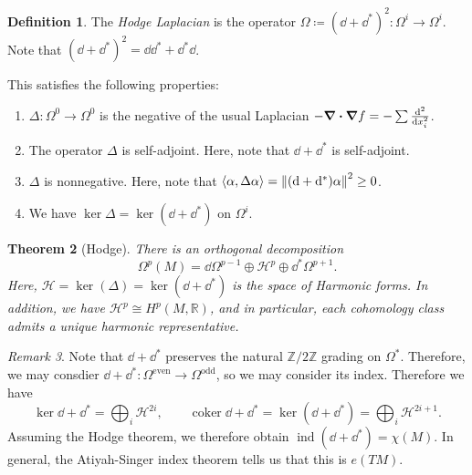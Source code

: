 \documentclass[leqno, openany]{memoir}
\newtheorem{thm}{Theorem}[section]
\theoremstyle{definition}
\newtheorem{defn}[thm]{Definition}
\theoremstyle{remark}
\newtheorem{rmk}[thm]{Remark}
\theoremstyle{plain}
\theoremstyle{definition}
\theoremstyle{remark}
\newcommand{\R}{\mathbb{R}}
\newcommand{\Z}{\mathbb{Z}}
\newcommand{\mc}[1]{\mathcal{#1}}
\newcommand{\mr}[1]{\mathrm{#1}}
\DeclareMathOperator{\coker}{coker}
\DeclareMathOperator{\ind}{ind}
\begin{document}
\begin{defn}
    The \textit{Hodge Laplacian} is the operator $\Omega \coloneqq {(\dd + \dd^*)}^2 \colon \Omega^i \to \Omega^i$. Note that ${(\dd + \dd^*)}^2 = \dd \dd^* + \dd^* \dd$.
\end{defn}

This satisfies the following properties: 
\begin{enumerate}
    \item $\Delta \colon \Omega^0 \to \Omega^0$ is the negative of the usual Laplacian $- \div \grad f = - \sum \dv[2]{x_i}$.
    \item The operator $\Delta$ is self-adjoint. Here, note that $\dd + \dd^*$ is self-adjoint. 
    \item $\Delta$ is nonnegative. Here, note that $\ev{\alpha, \Delta \alpha} = \norm{(\dd + \dd^*) \alpha}^2 \geq 0$.
    \item We have $\ker \Delta = \ker (\dd + \dd^*)$ on $\Omega^i$.
\end{enumerate}

\begin{thm}[Hodge]
    There is an orthogonal decomposition
    \[ \Omega^p(M) = \dd \Omega^{p-1} \oplus \mc{H}^p \oplus \dd^* \Omega^{p+1}. \]
    Here, $\mc{H} = \ker(\Delta) = \ker(\dd + \dd^*)$ is the space of \textit{Harmonic forms}. In addition, we have $\mc{H}^p \cong H^p(M, \R)$, and in particular, each cohomology class admits a unique harmonic representative.
\end{thm}

\begin{rmk}
    Note that $\dd + \dd^*$ preserves the natural $\Z/2\Z$ grading on $\Omega^*$. Therefore, we may consdier $\dd + \dd^* \colon \Omega^{\mr{even}} \to \Omega^{\mr{odd}}$, so we may consider its index. Therefore we have 
    \[ \ker \dd + \dd^* = \bigoplus_{i} \mc{H}^{2i}, \qquad \coker \dd + \dd^* = \ker (\dd + \dd^*) = \bigoplus_i \mc{H}^{2i+1}. \]
    Assuming the Hodge theorem, we therefore obtain $\ind(\dd + \dd^*) = \chi(M)$. In general, the Atiyah-Singer index theorem tells us that this is $e(TM)$.
\end{rmk}
\end{document}
